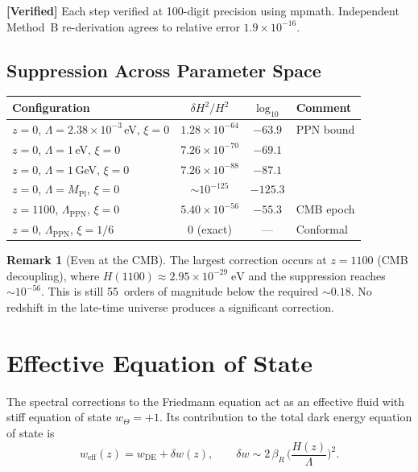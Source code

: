 \documentclass[11pt,a4paper]{article}
\newcommand{\Lam}{\Lambda}
\theoremstyle{plain}
\theoremstyle{definition}
\newtheorem{remark}[theorem]{Remark}
\newcommand{\verified}[1]{%
  \par\smallskip\noindent
  \colorbox{green!10}{\parbox{\dimexpr\linewidth-2\fboxsep}{%
    \textcolor{green!50!black}{\textbf{[Verified]}} #1}}%
  \par\smallskip}
\begin{document}
\verified{Each step verified at 100-digit precision using mpmath.
Independent Method~B re-derivation agrees to relative error
$1.9 \times 10^{-16}$.}

\subsection{Suppression Across Parameter Space}

\begin{center}
\begin{tabular}{lccl}
\toprule
Configuration & $\delta H^2/H^2$ & $\log_{10}$ & Comment \\
\midrule
$z=0$, $\Lam = 2.38 \times 10^{-3}$\,eV, $\xi=0$
  & $1.28 \times 10^{-64}$ & $-63.9$ & PPN bound \\
$z=0$, $\Lam = 1$\,eV, $\xi=0$
  & $7.26 \times 10^{-70}$ & $-69.1$ & \\
$z=0$, $\Lam = 1$\,GeV, $\xi=0$
  & $7.26 \times 10^{-88}$ & $-87.1$ & \\
$z=0$, $\Lam = M_{\mathrm{Pl}}$, $\xi=0$
  & $\sim 10^{-125}$ & $-125.3$ & \\
$z=1100$, $\Lam_{\mathrm{PPN}}$, $\xi=0$
  & $5.40 \times 10^{-56}$ & $-55.3$ & CMB epoch \\
$z=0$, $\Lam_{\mathrm{PPN}}$, $\xi=1/6$
  & $0$ (exact) & --- & Conformal \\
\bottomrule
\end{tabular}
\end{center}

\begin{remark}[Even at the CMB]
The largest correction occurs at $z = 1100$ (CMB decoupling), where
$H(1100) \approx 2.95 \times 10^{-29}\;\mathrm{eV}$ and the suppression
reaches ${\sim}10^{-56}$. This is still 55~orders of magnitude below the
required ${\sim}0.18$. No redshift in the late-time universe produces a
significant correction.
\end{remark}

\section{Effective Equation of State}\label{sec:weff}

The spectral corrections to the Friedmann equation act as an effective
fluid with stiff equation of state $w_\Theta = +1$. Its contribution to
the total dark energy equation of state is
\begin{equation}\label{eq:w-eff}
  w_{\mathrm{eff}}(z) = w_{\mathrm{DE}} + \delta w(z),
  \qquad
  \delta w \sim 2\,\beta_R\,\biggl(\frac{H(z)}{\Lam}\biggr)^{\!2}.
\end{equation}
\end{document}

